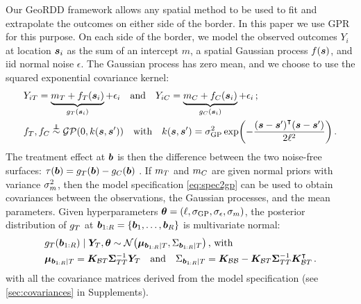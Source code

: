 \documentclass{article}
\newcommand{\autorefexternal}[1]{\autoref*{#1}}
\begin{document}
\label{sec:gpmodel}
Our GeoRDD framework allows any spatial method to be used to fit and extrapolate the outcomes on either side of the border.
In this paper we use GPR \citep{banerjee2014hierarchical,rasmussen2006gaussian} for this purpose.
On each side of the border, we model the observed outcomes \(Y_i\) at location \(\bm{s}_i\) as the sum of an intercept \(m\), a spatial Gaussian process \(f(\bm{s})\), and iid normal noise \(\epsilon\).
The Gaussian process has zero mean, and we choose to use the squared exponential covariance kernel:
\begin{equation}
    \begin{split}
        & Y_{i\treat} = \underbrace{m_\treat{} + f_\treat{}(\svec_i)}_{g_\treat{}(\svec_i)} + \epsilon_i \quad\text{and}\quad
        Y_{i\ctrol} = \underbrace{m_\ctrol{} + f_\ctrol{}(\svec_i)}_{g_\ctrol{}(\svec_i)} + \epsilon_i \,; \\
        & f_\treat{}, f_\ctrol{} \overset{\indep}{\sim} \GP\del{0, k(\svec, \svec')} \quad\text{with}\quad
        k(\svec,\svec') = \sigmaf^2 \exp\del{ - \frac{\del{\svec-\svec'}\trans\del{\svec-\svec'}}{2 \ell^2}} \,.
    \end{split}
    \label{eq:spec2gp}
\end{equation}
The treatment effect at \(\bm{b}\) is then the difference between the two noise-free surfaces:
    \(\tau(\bm{b}) = g_T{}(\bm{b}) - g_C{}(\bm{b})\)
.
\label{sec:inference}
If \(m_T\) and \(m_C\) are given normal priors with variance \(\sigma_{m}^2\), then the model specification \autoref{eq:spec2gp} can be used to obtain covariances between the observations, the Gaussian processes, and the mean parameters.
Given hyperparameters \(\bm{\theta} = \left\lparen\ell,\sigma_{\mathrm{GP}}, \sigma_{\epsilon}, \sigma_{m}\right\rparen\), the posterior distribution of \(g_T\) at \(\bm{b}_{1:R}=\left\lbrace\bm{b}_1,\ldots,\bm{b}_R\right\rbrace\) is multivariate normal:
\begin{equation}\begin{split}
    & g_\treat{}(\sentinels) \mid \yt{}, \hyperparam \sim \normal\del{\muvec_{\sentinels \mid T}, \Sigma_{\sentinels \mid T}} \,\text{, with} \\
    & \muvec_{\sentinels \mid T} =
    \KBT
    \STT^{-1} 
    \yt{} 
    \quad\text{and}\quad
    \Sigma_{\sentinels \mid T} =
    \KBB - \KBT \STT^{-1} \KBT\trans \,.
\end{split}
\label{eq:postvar2gp_t_or_c}
\end{equation}
with all the covariance matrices derived from the model specification (see \autorefexternal{sec:covariances} in Supplements).
\end{document}

